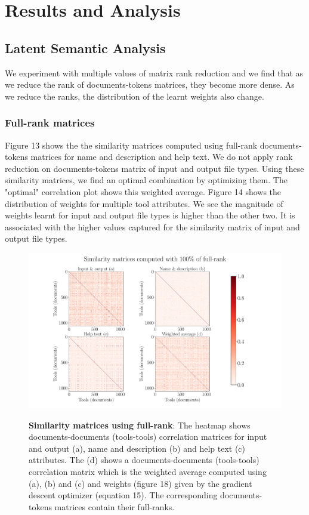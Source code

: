 \chapter{Results and Analysis}
\section{Latent Semantic Analysis}
We experiment with multiple values of matrix rank reduction and we find that as we reduce the rank of documents-tokens matrices, they become more dense. As we reduce the ranks, the distribution of  the learnt weights also change. 

\subsection{Full-rank matrices}

Figure 13 shows the the similarity matrices computed using full-rank documents-tokens matrices for name and description and help text. We do not apply rank reduction on documents-tokens matrix of input and output file types. Using these similarity matrices, we find an optimal combination by optimizing them. The "optimal" correlation plot shows this weighted average. Figure 14 shows the distribution of weights for multiple tool attributes. We see the magnitude of weights learnt for input and output file types is higher than the other two. It is associated with the higher values captured for the similarity matrix of input and output file types.

\begin{figure}[h]
\begin{centering}
    {\includegraphics[scale=0.35]{figures/Similarity_matrices_100.pdf}}
    \caption[Similarity matrices full rank]{\textbf{Similarity matrices using full-rank}: The heatmap shows documents-documents (tools-tools) correlation matrices for input and output (a), name and description (b) and help text (c) attributes. The (d) shows a documents-documents (tools-tools) correlation matrix which is the weighted average computed using (a), (b) and (c) and weights (figure 18) given by the gradient descent optimizer (equation 15). The corresponding documents-tokens matrices contain their full-ranks. }
\end{centering}
\end{figure}

